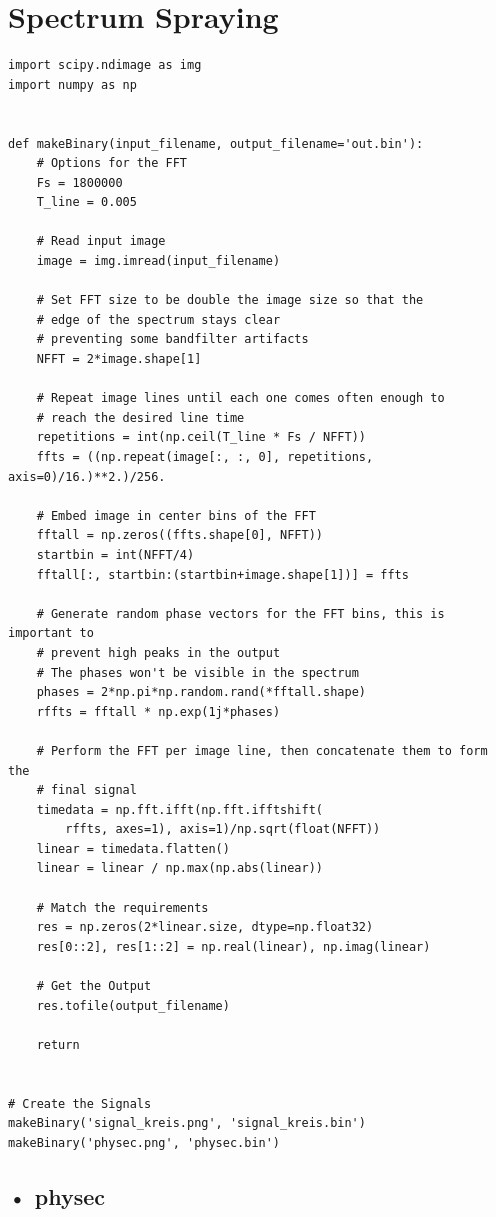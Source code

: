 \documentclass[12pt,a4paper]{article}
\begin{document}
\section{Spectrum Spraying}
\begin{verbatim}
import scipy.ndimage as img
import numpy as np


def makeBinary(input_filename, output_filename='out.bin'):
	# Options for the FFT
	Fs = 1800000
	T_line = 0.005

	# Read input image
	image = img.imread(input_filename)

	# Set FFT size to be double the image size so that the
	# edge of the spectrum stays clear
	# preventing some bandfilter artifacts
	NFFT = 2*image.shape[1]

	# Repeat image lines until each one comes often enough to
	# reach the desired line time
	repetitions = int(np.ceil(T_line * Fs / NFFT))
	ffts = ((np.repeat(image[:, :, 0], repetitions, axis=0)/16.)**2.)/256.

	# Embed image in center bins of the FFT
	fftall = np.zeros((ffts.shape[0], NFFT))
	startbin = int(NFFT/4)
	fftall[:, startbin:(startbin+image.shape[1])] = ffts

	# Generate random phase vectors for the FFT bins, this is important to
	# prevent high peaks in the output
	# The phases won't be visible in the spectrum
	phases = 2*np.pi*np.random.rand(*fftall.shape)
	rffts = fftall * np.exp(1j*phases)

	# Perform the FFT per image line, then concatenate them to form the
	# final signal
	timedata = np.fft.ifft(np.fft.ifftshift(
		rffts, axes=1), axis=1)/np.sqrt(float(NFFT))
	linear = timedata.flatten()
	linear = linear / np.max(np.abs(linear))

	# Match the requirements
	res = np.zeros(2*linear.size, dtype=np.float32)
	res[0::2], res[1::2] = np.real(linear), np.imag(linear)

	# Get the Output
	res.tofile(output_filename)

	return


# Create the Signals
makeBinary('signal_kreis.png', 'signal_kreis.bin')
makeBinary('physec.png', 'physec.bin')

\end{verbatim}


\subsection*{• physec}
\end{document}

